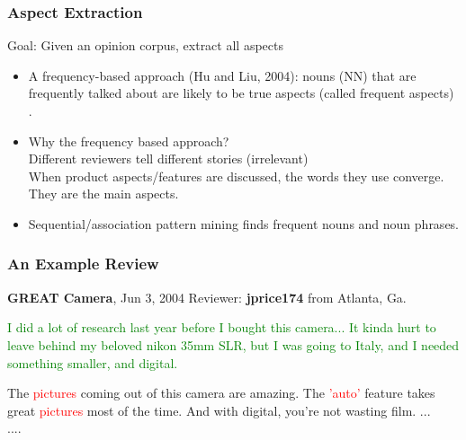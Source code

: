 \documentclass[t]{beamer}
\begin{document}
\begin{frame} \frametitle{Aspect Extraction} %

\begin{block}{Goal:}
Given an opinion corpus, extract all aspects 
\end{block}


\vfill

\begin{itemize}

\item A frequency-based approach (Hu and Liu, 2004): nouns (NN) that
  are frequently talked about are likely to be true aspects (called
  frequent aspects) . 

\item Why the frequency based approach? \\
Different reviewers tell different stories (irrelevant) \\
When product aspects/features are discussed, the words they use
converge. \\
They are the main aspects.

\item Sequential/association pattern mining finds frequent nouns and noun phrases.

\end{itemize}


\end{frame}

\begin{frame} \frametitle{An Example Review} %

\begin{block}{\textbf{GREAT Camera}, Jun 3, 2004 Reviewer: \textbf{jprice174} from Atlanta, Ga.}

\textcolor{green}{
I did a lot of research last year before I bought this camera... It
kinda hurt to leave behind my beloved nikon 35mm SLR, but I was going
to Italy, and I needed something smaller, and digital. 
}

The \textcolor{red}{pictures} coming out of this camera are amazing. The \textcolor{red}{'auto'} feature
takes great \textcolor{red}{pictures} most of the time. And with digital, you're not
wasting film. ...\\
....
\end{block}

\end{frame}
\end{document}
